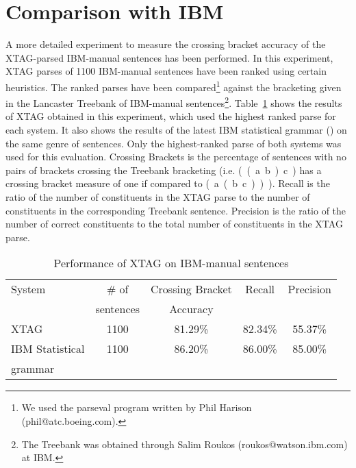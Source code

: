 \section{Comparison with IBM}

A more detailed experiment to measure the crossing bracket accuracy of the
XTAG-parsed IBM-manual sentences has been performed. In this experiment, XTAG
parses of 1100 IBM-manual sentences have been ranked using certain
heuristics. The ranked parses have been compared\footnote{We used the parseval
program written by Phil Harison (phil@atc.boeing.com).}  against the bracketing
given in the Lancaster Treebank of IBM-manual sentences\footnote{The Treebank
was obtained through Salim Roukos (roukos@watson.ibm.com) at
IBM.}. Table~\ref{ibm-results} shows the results of XTAG obtained in this
experiment, which used the highest ranked parse for each system. It also shows
the results of the latest IBM statistical grammar (\cite{jelineketal94}) on the
same genre of sentences. Only the highest-ranked parse of both systems was used
for this evaluation. Crossing Brackets is the percentage of sentences with no
pairs of brackets crossing the Treebank bracketing (i.e.  (~(~a~b~)~c~) has a
crossing bracket measure of one if compared to (~a~(~b~c~)~)~). Recall is the
ratio of the number of constituents in the XTAG parse to the number of
constituents in the corresponding Treebank sentence.  Precision is the ratio of
the number of correct constituents to the total number of constituents in the
XTAG parse.

\begin{table}[ht]
\centering
\begin{tabular}{|l|c|c|c|c|} \hline 
System & \# of & Crossing Bracket & Recall & Precision \\
& sentences & Accuracy & & \\ \hline
XTAG & 1100 & 81.29\% & 82.34\% & 55.37\% \\ \hline
IBM Statistical & 1100 & 86.20\% & 86.00\% & 85.00\% \\
grammar & &  &  &\\ \hline
\end{tabular}

\vspace{0.1in}

\caption{Performance of XTAG on IBM-manual sentences}
\label{ibm-results} 

\end{table}

